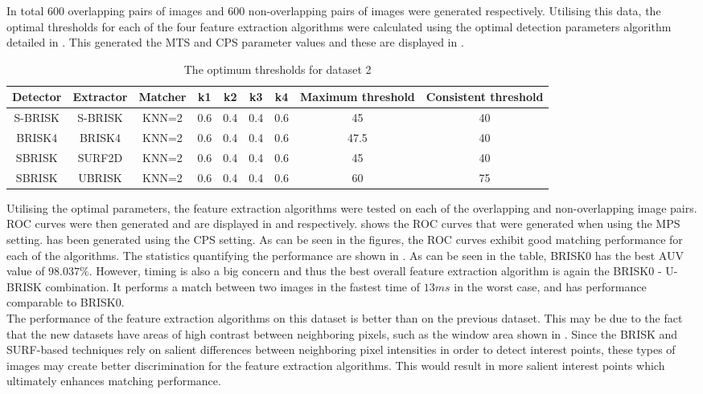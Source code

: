 \documentclass{article}
\begin{document}
In total $600$ overlapping pairs of images and $600$ non-overlapping pairs of images were generated respectively. Utilising this data, the optimal thresholds for each of the four feature extraction algorithms were calculated using the optimal detection parameters algorithm detailed in . This generated the MTS and CPS parameter values and these are displayed in .\\

\begin{table}
\caption{The optimum thresholds for dataset 2}
\begin{tabular}{|c|c|c|c|c|c|c|c|c|}
\hline 
Detector & Extractor & Matcher & k1 & k2 & k3 & k4 & Maximum threshold & Consistent threshold\tabularnewline
\hline 
\hline 
S-BRISK & S-BRISK & KNN=2 & 0.6 & 0.4 & 0.4 & 0.6 & 45 & 40\tabularnewline
\hline 
BRISK4 & BRISK4 & KNN=2 & 0.6 & 0.4 & 0.4 & 0.6 & 47.5 & 40\tabularnewline
\hline 
SBRISK & SURF2D & KNN=2 & 0.6 & 0.4 & 0.4 & 0.6 & 45 & 40\tabularnewline
\hline 
SBRISK & UBRISK & KNN=2 & 0.6 & 0.4 & 0.4 & 0.6 & 60 & 75\tabularnewline
\hline 
\end{tabular}
\label{tab:dataset2OptimalThresholds}
\end{table}

Utilising the optimal parameters, the feature extraction algorithms were tested on each of the overlapping and non-overlapping image pairs. ROC curves were then generated and are displayed in  and  respectively.  shows the ROC curves that were generated when using the MPS setting.  has been generated using the CPS setting. As can be seen in the figures, the ROC curves exhibit good matching performance for each of the algorithms. The statistics quantifying the performance are shown in . As can be seen in the table, BRISK0 has the best AUV value of $98.037\%$. However, timing is also a big concern and thus the best overall feature extraction algorithm is again the BRISK0 - U-BRISK combination. It performs a match between two images in the fastest time of $13 ms$ in the worst case, and has performance comparable to BRISK0.\\

The performance of the feature extraction algorithms on this dataset is better than on the previous dataset. This may be due to the fact that the new datasets have areas of high contrast between neighboring pixels, such as the window area shown in . Since the BRISK and SURF-based techniques rely on salient differences between neighboring pixel intensities in order to detect interest points, these types of images may create better discrimination for the feature extraction algorithms. This would result in more salient interest points which ultimately enhances matching performance.\\
\end{document}

